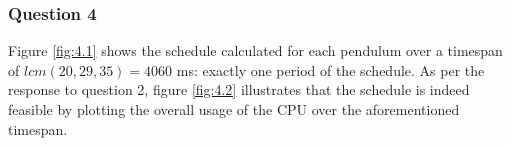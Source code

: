 \subsubsection{Question 4}

Figure \ref{fig:4.1} shows the schedule calculated for each pendulum over a
timespan of $lcm(20,29,35) = 4060$ ms: exactly one period of the schedule.
As per the response to question 2, figure \ref{fig:4.2} illustrates that the
schedule is indeed feasible by plotting the overall usage of the CPU over the
aforementioned timespan.


\noindent{}

